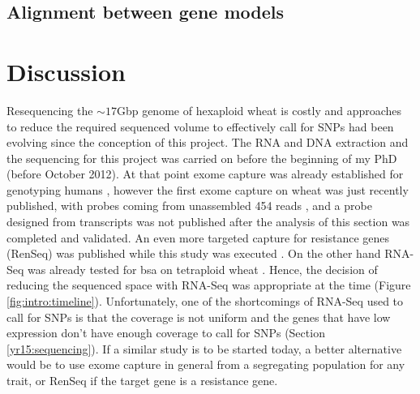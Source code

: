 \subsection{Alignment between gene models}

\section{Discussion} 

Resequencing the $\sim17$Gbp genome of hexaploid wheat is costly and approaches to reduce the required sequenced volume to effectively call for SNPs had been evolving since the conception of this project. 
The RNA and DNA extraction and the sequencing for this project was carried on before the beginning of my PhD (before October 2012). 
At that point exome capture was already established for genotyping humans \citep{Ng2009}, however the first exome capture on wheat was just recently published, with probes coming from unassembled 454 reads \citep{Winfield2012}, and a probe designed from transcripts \citep{Henry2014} was not published after the analysis of this section was completed and validated.
An even more targeted capture for resistance genes (RenSeq) was published while this study was executed \citep{Jupe2013}.
On the other hand RNA-Seq was already tested for \acrlong{bsa} on tetraploid wheat \citep{Trick2012}.  
Hence, the decision of reducing the sequenced space with RNA-Seq was appropriate at the time (Figure \ref{fig:intro:timeline}). 
Unfortunately, one of the shortcomings of RNA-Seq used to call for SNPs is that the coverage is not uniform and the genes that have low expression don't have enough coverage to call for SNPs (Section  \ref{yr15:sequencing}).
If a similar study is to be started today, a better alternative would be to use exome capture in general from a segregating population for any trait, or RenSeq if the target gene is a resistance gene. 



